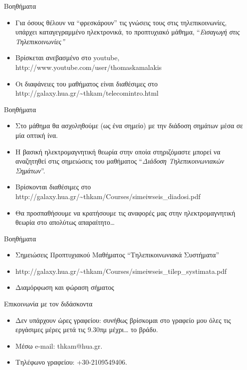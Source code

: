 \documentclass[11pt,aspectratio=169]{beamer}
\begin{document}
\begin{frame}[t]{Βοηθήματα}
\begin{itemize}
\item Για όσους θέλουν να “φρεσκάρουν” τις γνώσεις τους στις τηλεπικοινωνίες, υπάρχει καταγεγραμμένο ηλεκτρονικά,  το προπτυχιακό μάθημα, “\textit{Εισαγωγή στις Τηλεπικοινωνίες”}
\item Βρίσκεται ανεβασμένο στο youtube, http://www.youtube.com/user/thomaskamalakis
\item Οι διαφάνειες του μαθήματος είναι διαθέσιμες στο http://galaxy.hua.gr/\textasciitilde{}thkam/telecomintro.html
\end{itemize}
\end{frame}

\begin{frame}[t]{Βοηθήματα}
\begin{itemize}
\item Στο μάθημα θα ασχοληθούμε (ως ένα σημείο) με την διάδοση σημάτων μέσα σε μία οπτική ίνα.
\item Η βασική ηλεκτρομαγνητική θεωρία στην οποία στηριζόμαστε μπορεί να αναζητηθεί στις σημειώσεις του μαθήματος “\textit{Διάδοση Τηλεπικοινωνιακών Σημάτων}”.
\item Βρίσκονται διαθέσιμες στο http://galaxy.hua.gr/\textasciitilde{}thkam/Courses/simeiwseis\_diadosi.pdf
\item Θα προσπαθήσουμε να κρατήσουμε τις αναφορές μας στην ηλεκτρομαγνητική θεωρία στο απολύτως απαραίτητο…
\end{itemize}
\end{frame}

\begin{frame}[t]{Βοηθήματα}
\begin{itemize}
\item Σημειώσεις Προπτυχιακού Μαθήματος “Τηλεπικοινωνιακά Συστήματα”
\item http://galaxy.hua.gr/\textasciitilde{}thkam/Courses/simeiwseis\_tilep\_systimata.pdf
\item Διαμόρφωση και φώραση σήματος
\end{itemize}
\end{frame}

\begin{frame}[t]{Επικοινωνία με τον διδάσκοντα}
\begin{itemize}
\item Δεν υπάρχουν ώρες γραφείου: συνήθως βρίσκομαι στο γραφείο μου όλες τις εργάσιμες μέρες μετά τις 9.30πμ μέχρι… το βράδυ.
\item Μέσω e-mail: thkam@hua.gr.
\item Τηλέφωνο γραφείου: +30-2109549406.
\end{itemize}
\end{frame}
\end{document}
